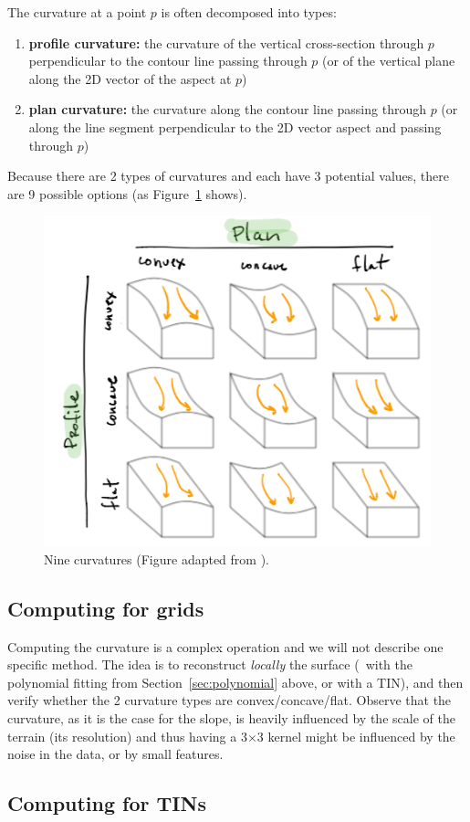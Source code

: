 The curvature at a point $p$ is often decomposed into types:
\begin{enumerate}
  \item \textbf{profile curvature:} the curvature of the vertical cross-section through $p$ perpendicular to the contour line passing through $p$ (or of the vertical plane along the 2D vector of the aspect at $p$)
  \item \textbf{plan curvature:} the curvature along the contour line passing through $p$ (or along the line segment perpendicular to the 2D vector aspect and passing through $p$)
\end{enumerate} 
Because there are 2 types of curvatures and each have 3 potential values, there are 9 possible options (as Figure~\ref{fig:curvatures} shows).
\begin{figure}
  \centering
  \includegraphics[width=0.6\linewidth]{figs/curvatures}
  \caption{Nine curvatures (Figure adapted from \citet{vanKreveld97}).}
\label{fig:curvatures}
\end{figure}


\subsection{Computing for grids}

Computing the curvature is a complex operation and we will not describe one specific method.
The idea is to reconstruct \emph{locally} the surface (\eg\ with the polynomial fitting from Section~\ref{sec:polynomial} above, or with a TIN), and then verify whether the 2 curvature types are convex/concave/flat.
Observe that the curvature, as it is the case for the slope, is heavily influenced by the scale of the terrain (its resolution) and thus having a 3$\times$3 kernel might be influenced by the noise in the data, or by small features.


\subsection{Computing for TINs}

